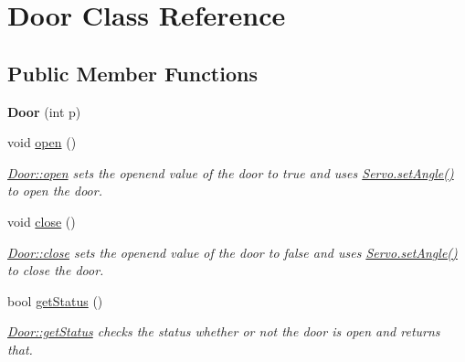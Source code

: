 \hypertarget{class_door}{}\section{Door Class Reference}
\label{class_door}
\subsection*{Public Member Functions}
\begin{DoxyCompactItemize}
\item 
\hypertarget{class_door_a0da54ea8766cd6438e003de46390adaf}{}{\bfseries Door} (int p)\label{class_door_a0da54ea8766cd6438e003de46390adaf}

\item 
\hypertarget{class_door_a141b8ac2ab99e1d7a218cdfb52004937}{}void \hyperlink{class_door_a141b8ac2ab99e1d7a218cdfb52004937}{open} ()\label{class_door_a141b8ac2ab99e1d7a218cdfb52004937}

\begin{DoxyCompactList}\small\item\em \hyperlink{class_door_a141b8ac2ab99e1d7a218cdfb52004937}{Door\+::open} sets the openend value of the door to true and uses \hyperlink{class_servo_aa8ccde828af12dfd201d716fbfe7a13e}{Servo.\+set\+Angle()} to open the door. \end{DoxyCompactList}\item 
\hypertarget{class_door_a48d247ad81623d1ca9ec11d19510827c}{}void \hyperlink{class_door_a48d247ad81623d1ca9ec11d19510827c}{close} ()\label{class_door_a48d247ad81623d1ca9ec11d19510827c}

\begin{DoxyCompactList}\small\item\em \hyperlink{class_door_a48d247ad81623d1ca9ec11d19510827c}{Door\+::close} sets the openend value of the door to false and uses \hyperlink{class_servo_aa8ccde828af12dfd201d716fbfe7a13e}{Servo.\+set\+Angle()} to close the door. \end{DoxyCompactList}\item 
bool \hyperlink{class_door_a040ff2e864f702c36cc7e1ee4770432d}{get\+Status} ()
\begin{DoxyCompactList}\small\item\em \hyperlink{class_door_a040ff2e864f702c36cc7e1ee4770432d}{Door\+::get\+Status} checks the status whether or not the door is open and returns that. \end{DoxyCompactList}\end{DoxyCompactItemize}


